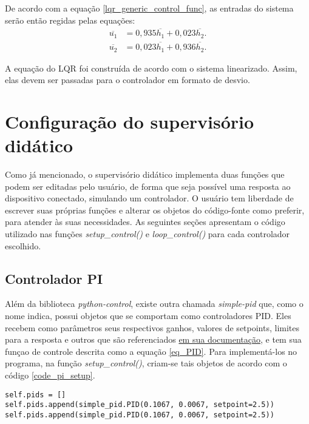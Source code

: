 De acordo com a equação \eqref{lqr_generic_control_func}, as entradas do sistema serão então regidas pelas equações:
\begin{align}
\overline{u_1} &= 0,935 \overline{h_1} + 0,023 \overline{h_2}. \\
\overline{u_2} &= 0,023 \overline{h_1} + 0,936 \overline{h_2}.
\label{lqr_control_function}
\end{align}

A equação do LQR foi construída de acordo com o sistema linearizado. Assim, elas devem ser passadas para o controlador em formato de desvio.

\section{Configuração do supervisório didático}

Como já mencionado, o supervisório didático implementa duas funções que podem ser editadas pelo usuário, de forma que seja possível uma resposta ao dispositivo conectado, simulando um controlador. O usuário tem liberdade de escrever suas próprias funções e alterar os objetos do código-fonte como preferir, para atender às suas necessidades. As seguintes seções apresentam o código utilizado nas funções \emph{setup\_control()} e \emph{loop\_control()} para cada controlador escolhido.

\subsection{Controlador PI}

Além da biblioteca \emph{python-control}, existe outra chamada \emph{simple-pid} que, como o nome indica, possui objetos que se comportam como controladores PID. Eles recebem como parâmetros seus respectivos ganhos, valores de setpoints, limites para a resposta e outros que são referenciados \href{https://pypi.org/project/simple-pid/}{em sua documentação}, e tem sua funçao de controle descrita como a equação \eqref{eq_PID}. Para implementá-los no programa, na função \emph{setup\_control()}, criam-se tais objetos de acordo com o código \ref{code_pi_setup}.

\begin{code}
\begin{lstlisting}
self.pids = []
self.pids.append(simple_pid.PID(0.1067, 0.0067, setpoint=2.5))
self.pids.append(simple_pid.PID(0.1067, 0.0067, setpoint=2.5))
\end{lstlisting}
\label{code_pi_setup}
\end{code}

